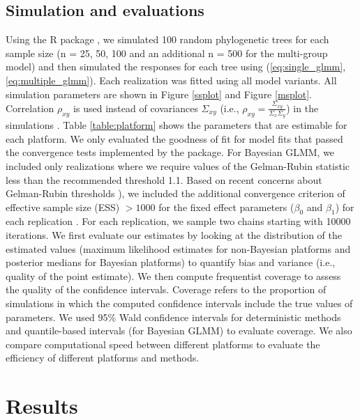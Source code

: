 \documentclass[12pt]{article}
\begin{document}
\subsection*{Simulation and evaluations}

Using the R package  \citep{ape}, we simulated 100 random phylogenetic trees  for each sample size (n = 25, 50, 100 and an additional n = 500 for the multi-group model) and then simulated the responses for each tree using (\ref{eq:single_glmm}, \ref{eq:multiple_glmm}). 
Each realization was fitted using all model variants. 
All simulation parameters are shown in Figure \ref{ssplot} and Figure \ref{msplot}. 
Correlation $\rho_{xy}$ is used instead of covariances $\Sigma_{xy}$ (i.e., $\rho_{xy} = \frac{\Sigma_{xy}}{\Sigma_{x}\Sigma_{y}}$) in the simulations .
Table \ref{table:platform} shows the parameters that are estimable for each platform. 
We only evaluated the goodness of fit for model fits that passed the convergence tests implemented by the package.
For Bayesian GLMM, we included only realizations where we require values of the Gelman-Rubin statistic less than the recommended threshold 1.1. Based on recent concerns about Gelman-Rubin thresholds \citep{vats2018revisiting}), we included the additional convergence criterion of effective sample size (ESS) $>1000$ for the fixed effect parameters ($\beta_{0}$ and $\beta_{1}$) for each replication \citep{vehtari2019rank}. 
For each replication, we sample two chains starting with 10000 iterations. 
We first evaluate our estimates by looking at the distribution of the estimated values (maximum likelihood estimates for non-Bayesian platforms and posterior medians for Bayesian platforms) to quantify bias and variance (i.e., quality of the point estimate).
We then compute frequentist coverage to assess the quality of the confidence intervals.
Coverage refers to the proportion of simulations in which the computed confidence intervals include the true values of parameters.
We used 95\% Wald confidence intervals for deterministic methods and quantile-based intervals (for Bayesian GLMM) to evaluate coverage.
We also compare computational speed between different platforms to evaluate the efficiency of different platforms and methods. 

\section*{Results}
\end{document}
